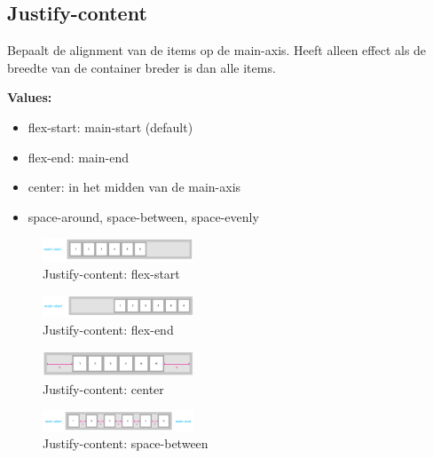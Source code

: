 \documentclass{article}
\newcommand{\bold}[1]{\textbf{#1}}
\begin{document}
\subsection{Justify-content}

Bepaalt de alignment van de items op de main-axis.
Heeft alleen effect als de breedte van de container breder is dan alle items.

\bold{Values:}
\begin{itemize}
    \item flex-start: main-start (default)
    \item flex-end: main-end
    \item center: in het midden van de main-axis
    \item space-around, space-between, space-evenly
\end{itemize}


\begin{figure}[H]
    \centering
    \includegraphics[width=0.4\textwidth]{img/Screenshot_20200427_093349.png}
    \caption{Justify-content: flex-start}
\end{figure}

\begin{figure}[H]
    \centering
    \includegraphics[width=0.4\textwidth]{img/Screenshot_20200427_093608.png}
    \caption{Justify-content: flex-end}
\end{figure}

\begin{figure}[H]
    \centering
    \includegraphics[width=0.4\textwidth]{img/Screenshot_20200427_093729.png}
    \caption{Justify-content: center}
\end{figure}

\begin{figure}[H]
    \centering
    \includegraphics[width=0.4\textwidth]{img/Screenshot_20200427_093753.png}
    \caption{Justify-content: space-between}
\end{figure}
\end{document}
